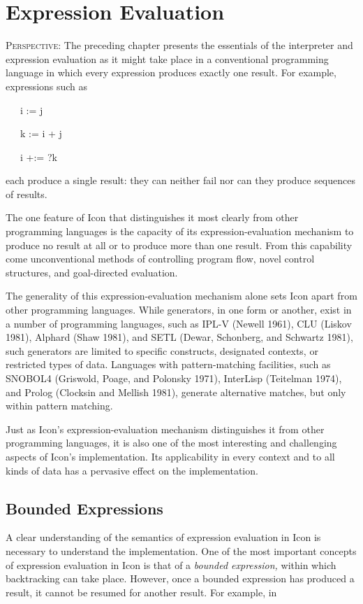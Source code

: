 \chapter{Expression Evaluation}

\textsc{Perspective}: The preceding chapter presents the essentials of
the interpreter and expression evaluation as it might take place in a
conventional programming language in which every expression produces
exactly one result. For example, expressions such as

{\ttfamily\mdseries
\ \ \ i := j}

{\ttfamily\mdseries
\ \ \ k := i + j}

{\ttfamily\mdseries
\ \ \ i +:= ?k}

\noindent each produce a single result: they can neither fail nor can
they produce sequences of results.

The one feature of Icon that distinguishes it most clearly from other
programming languages is the capacity of its expression-evaluation
mechanism to produce no result at all or to produce more than one
result. From this capability come unconventional methods of
controlling program flow, novel control structures, and goal-directed
evaluation.

The generality of this expression-evaluation mechanism alone sets Icon
apart from other programming languages. While generators, in one form
or another, exist in a number of programming languages, such as IPL-V
(Newell 1961), CLU (Liskov 1981), Alphard (Shaw 1981), and SETL
(Dewar, Schonberg, and Schwartz 1981), such generators are limited to
specific constructs, designated contexts, or restricted types of
data. Languages with pattern-matching facilities, such as SNOBOL4
(Griswold, Poage, and Polonsky 1971), InterLisp (Teitelman 1974), and
Prolog (Clocksin and Mellish 1981), generate alternative matches, but
only within pattern matching.

Just as Icon's expression-evaluation mechanism distinguishes it from
other programming languages, it is also one of the most interesting
and challenging aspects of Icon's implementation. Its applicability in
every context and to all kinds of data has a pervasive effect on the
implementation.


\section{Bounded Expressions}

A clear understanding of the semantics of expression evaluation in
Icon is necessary to understand the implementation.  One of the most
important concepts of expression evaluation in Icon is that of a
\textit{bounded expression, }within which backtracking can take
place. However, once a bounded expression has produced a result, it
cannot be resumed for another result. For example, in

